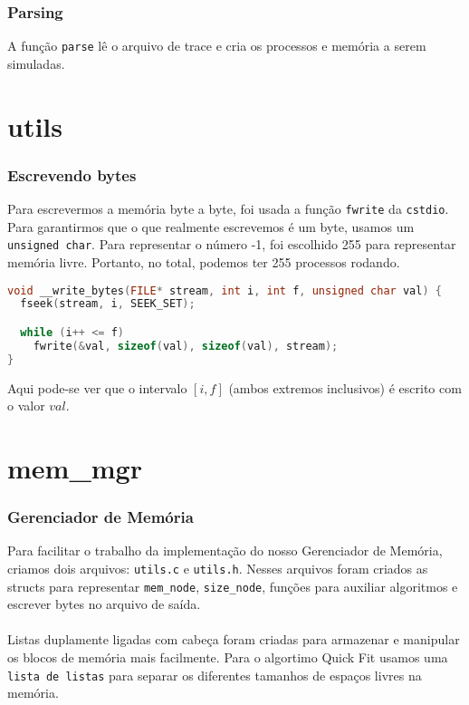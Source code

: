 \documentclass{beamer}
\begin{document}
\begin{frame}
  \frametitle{Parsing}
  A função \texttt{parse} lê o arquivo de trace e cria os processos e memória a serem simuladas.
\end{frame}

\section{utils}

\begin{frame}[fragile]
  \frametitle{Escrevendo bytes}
  Para escrevermos a memória byte a byte, foi usada a função \texttt{fwrite} da \texttt{cstdio}.
  Para garantirmos que o que realmente escrevemos é um byte, usamos um \texttt{unsigned char}. Para
  representar o número -1, foi escolhido 255 para representar memória livre. Portanto, no total,
  podemos ter 255 processos rodando.

  \begin{lstlisting}[language=C++,basicstyle=\scriptsize]
void __write_bytes(FILE* stream, int i, int f, unsigned char val) {
  fseek(stream, i, SEEK_SET);

  while (i++ <= f)
    fwrite(&val, sizeof(val), sizeof(val), stream);
}
  \end{lstlisting}

  Aqui pode-se ver que o intervalo $[i, f]$ (ambos extremos inclusivos) é escrito com o valor $val$.
\end{frame}

\section{mem\_mgr}

\begin{frame}
  \frametitle{Gerenciador de Memória}
  Para facilitar o trabalho da implementação do nosso Gerenciador de Memória, criamos dois arquivos: \texttt{utils.c} e \texttt{utils.h}. Nesses arquivos foram criados as structs para representar \texttt{mem\_node}, \texttt{size\_node}, funções para auxiliar algoritmos e escrever bytes no arquivo de saída. \\~\\

  Listas duplamente ligadas com cabeça foram criadas para armazenar e manipular os blocos de memória mais facilmente. Para o algortimo Quick Fit usamos uma \texttt{lista de listas} para separar os diferentes tamanhos de espaços livres na memória.
\end{frame}
\end{document}
